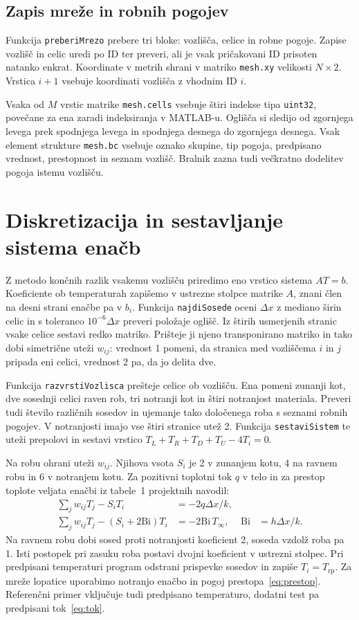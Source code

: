 \documentclass[a4paper,11pt]{article}
\begin{document}
\subsection{Zapis mreže in robnih pogojev}
Funkcija \texttt{preberiMrezo} prebere tri bloke: vozlišča, celice in robne pogoje. Zapise vozlišč in celic uredi po ID ter preveri, ali je vsak pričakovani ID prisoten natanko enkrat. Koordinate v metrih shrani v matriko \texttt{mesh.xy} velikosti \(N\times2\). Vrstica \(i+1\) vsebuje koordinati vozlišča z vhodnim ID \(i\).

Vsaka od \(M\) vrstic matrike \texttt{mesh.cells} vsebuje štiri indekse tipa \texttt{uint32}, povečane za ena zaradi indeksiranja v MATLAB-u. Oglišča si sledijo od zgornjega levega prek spodnjega levega in spodnjega desnega do zgornjega desnega. Vsak element strukture \texttt{mesh.bc} vsebuje oznako skupine, tip pogoja, predpisano vrednost, prestopnost in seznam vozlišč. Bralnik zazna tudi večkratno dodelitev pogoja istemu vozlišču.


\section{Diskretizacija in sestavljanje sistema enačb}
Z metodo končnih razlik vsakemu vozlišču priredimo eno vrstico sistema \(AT=b\). Koeficiente ob temperaturah zapišemo v ustrezne stolpce matrike \(A\), znani člen na desni strani enačbe pa v \(b_i\).
Funkcija \texttt{najdiSosede} oceni \(\Delta x\) z mediano širin celic in s toleranco \(10^{-6}\Delta x\) preveri položaje oglišč. Iz štirih usmerjenih stranic vsake celice sestavi redko matriko. Prišteje ji njeno transponirano matriko in tako dobi simetrične uteži \(w_{ij}\): vrednost 1 pomeni, da stranica med vozliščema \(i\) in \(j\) pripada eni celici, vrednost 2 pa, da jo delita dve.

Funkcija \texttt{razvrstiVozlisca} prešteje celice ob vozlišču. Ena pomeni zunanji kot, dve sosednji celici raven rob, tri notranji kot in štiri notranjost materiala. Preveri tudi število različnih sosedov in ujemanje tako določenega roba s seznami robnih pogojev. V notranjosti imajo vse štiri stranice utež 2. Funkcija \texttt{sestaviSistem} te uteži prepolovi in sestavi vrstico \(T_L+T_R+T_D+T_U-4T_i=0\).

Na robu ohrani uteži \(w_{ij}\). Njihova vsota \(S_i\) je 2 v zunanjem kotu, 4 na ravnem robu in 6 v notranjem kotu. Za pozitivni toplotni tok \(q\) v telo in za prestop toplote veljata enačbi iz tabele~1 projektnih navodil:
\begin{align}
\sum_j w_{ij}T_j-S_iT_i &= -2q\Delta x/k, \label{eq:tok}\\
\sum_j w_{ij}T_j-(S_i+2\mathrm{Bi})T_i &= -2\mathrm{Bi}\,T_\infty,
&\mathrm{Bi}&=h\Delta x/k. \label{eq:prestop}
\end{align}
Na ravnem robu dobi sosed proti notranjosti koeficient 2, soseda vzdolž roba pa 1. Isti postopek pri zasuku roba postavi dvojni koeficient v ustrezni stolpec. Pri predpisani temperaturi program odstrani prispevke sosedov in zapiše \(T_i=T_{\mathrm{rp}}\). Za mreže lopatice uporabimo notranjo enačbo in pogoj prestopa~\eqref{eq:prestop}. Referenčni primer vključuje tudi predpisano temperaturo, dodatni test pa predpisani tok~\eqref{eq:tok}.
\end{document}
